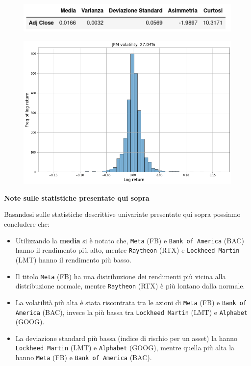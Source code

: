 \documentclass{article}
\begin{document}
\begin{figure}[h]
  \centering
  \begin{minipage}{.5\textwidth}
    \centering
    \vspace{4.35cm}
    \includegraphics[width=1\linewidth]{jpm_stats.png}
    \label{fig:jpm_stats}
  \end{minipage}%
  \begin{minipage}{.5\textwidth}
    \centering
    \includegraphics[width=1\linewidth]{jpm_volatility.png}
    \label{fig:jpm_vol}
  \end{minipage}
\end{figure}

\textbf{Note sulle statistiche presentate qui sopra}

Basandosi sulle statistiche descrittive univariate presentate qui sopra possiamo concludere che:

\begin{itemize}
  \item Utilizzando la \textbf{media} si è notato che, \verb|Meta| (FB) e \verb|Bank of America| (BAC) hanno il rendimento più alto,
  mentre \verb|Raytheon| (RTX) e \verb|Lockheed Martin| (LMT) hanno il rendimento più basso.
  \item Il titolo \verb|Meta| (FB) ha una distribuzione dei rendimenti più vicina alla distribuzione normale, mentre 
  \verb|Raytheon| (RTX) è più lontano dalla normale.
  \item La volatilità più alta è stata riscontrata tra le azioni di \verb|Meta| (FB) e \verb|Bank of America| (BAC), invece
  la più bassa tra \verb|Lockheed Martin| (LMT) e \verb|Alphabet| (GOOG).
  \item La deviazione standard più bassa (indice di rischio per un asset) la hanno \verb|Lockheed Martin| (LMT) e \verb|Alphabet| (GOOG), mentre
  quella più alta la hanno \verb|Meta| (FB) e \verb|Bank of America| (BAC).
\end{itemize}
\end{document}
